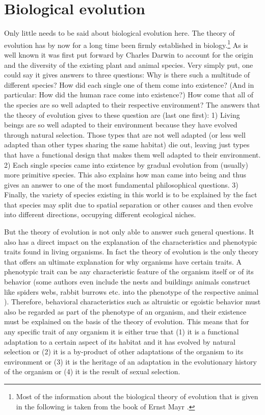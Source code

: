 \section{Biological evolution}

Only little needs to be said about biological evolution here. The
theory of evolution has by now for a long time been firmly established
in biology.\footnote{Most of the information about the biological
  theory of evolution that is given in the following is taken from the
  book of Ernst Mayr \cite[]{mayr:2001}.} As is well known it was
first put forward by Charles Darwin to account for the origin and the
diversity of the existing plant and animal species. Very simply put,
one could say it gives answers to three questions: Why is there such a
multitude of different species?  How did each single one of them come
into existence? (And in particular: How did the human race come into
existence?) How come that all of the species are so well adapted to
their respective environment? The answers that the theory of evolution
gives to these question are (last one first): 1) Living beings are so
well adapted to their environment because they have evolved through
natural selection. Those types that are not well adapted (or less well
adapted than other types sharing the same habitat) die out, leaving
just types that have a functional design that makes them well adapted
to their environment. 2) Each single species came into existence by
gradual evolution from (usually) more primitive species.  This also
explains how man came into being and thus gives an answer to one of
the most fundamental philosophical questions. 3) Finally, the variety
of species existing in this world is to be explained by the fact that
species may split due to spatial separation or other causes and then
evolve into different directions, occupying different ecological
niches.

But the theory of evolution is not only able to answer such general questions.
It also has a direct impact on the explanation of the characteristics and
phenotypic traits found in living organisms. In fact the theory of evolution
is the only theory that offers an ultimate explanation for why organisms have
certain traits. A phenotypic trait can be any characteristic feature of the
organism itself or of its behavior (some authors even include the nests and
buildings animals construct like spiders webs, rabbit burrows etc. into the
phenotype of the respective animal \cite[]{dawkins:1982}). Therefore,
behavioral characteristics such as altruistic or egoistic behavior must
also be regarded as part of the phenotype of an organism, and their existence
must be explained on the basis of the theory of evolution. This means that for
any specific trait of any organism it is either true that (1) it is a
functional adaptation to a certain aspect of its habitat and it has evolved by
natural selection or (2) it is a by-product of other adaptations of the
organism to its environment or (3) it is the heritage of an adaptation in the
evolutionary history of the organism or (4) it is the result of sexual
selection.


